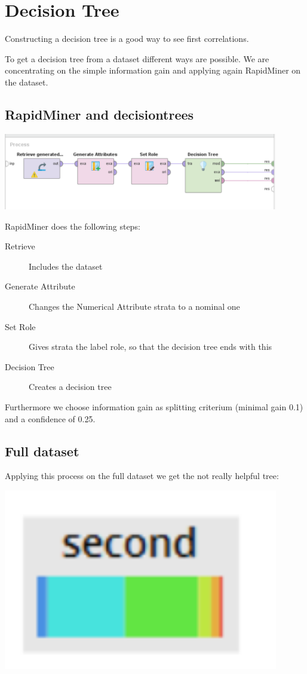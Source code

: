 \section{Decision Tree}

Constructing a decision tree is a good way to see first correlations.

To get a decision tree from a dataset different ways are possible. We are concentrating on the simple information gain and applying again RapidMiner on the dataset. 

\subsection*{RapidMiner and decisiontrees}
\includegraphics[width = 0.9\textwidth]{DecisionTreeRapidModel.PNG}

RapidMiner does the following steps:
\begin{description}
	\item[Retrieve] Includes the dataset
	\item[Generate Attribute] Changes the Numerical Attribute strata to a nominal one
	\item[Set Role] Gives strata the label role, so that the decision tree ends with this
	\item[Decision Tree] Creates a decision tree
\end{description}

Furthermore we choose information gain as splitting criterium (minimal gain 0.1) and a confidence of 0.25.

\subsection*{Full dataset}

Applying this process on the full dataset we get the not really helpful tree:

\includegraphics[width=0.9\textwidth]{DecisionTreeRapidTreeFull.PNG}
